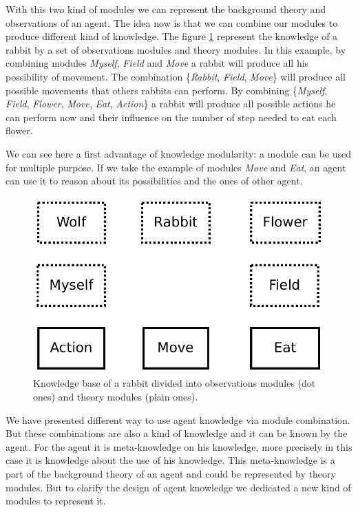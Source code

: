 \documentclass{aamas2012}
\begin{document}
	With this two kind of modules we can represent the background theory and observations of an agent.
	The idea now is that we can combine our modules to produce different kind of knowledge.
	The figure \ref{module_combination} represent the knowledge of a rabbit by a set of observations modules and theory modules.
	In this example, by combining modules \emph{Myself}, \emph{Field} and \emph{Move} a rabbit will produce all his possibility of movement.
	The combination \{\emph{Rabbit}, \emph{Field}, \emph{Move}\} will produce all possible movements that others rabbits can perform. 
	By combining \{\emph{Myself}, \emph{Field}, \emph{Flower}, \emph{Move}, \emph{Eat}, \emph{Action}\} 
	a rabbit will produce all possible actions he can perform now and their influence on the number of step needed to eat each flower.
	
	We can see here a first advantage of knowledge modularity: a module can be used for multiple purpose.
	If we take the example of modules \emph{Move} and \emph{Eat}, an agent can use it to reason about its possibilities and the ones of other agent.
	
	\begin{figure}
		\centering
		\includegraphics[keepaspectratio=true, scale=0.4]{module_combination.pdf}
		\caption
		{
			\label{module_combination}
			Knowledge base of a rabbit divided into observations modules (dot ones) and theory modules (plain ones).
		}
	\end{figure}

	We have presented different way to use agent knowledge via module combination.
	But these combinations are also a kind of knowledge and it can be known by the agent.
	For the agent it is meta-knowledge on his knowledge, more precisely in this case it is knowledge about the use of his knowledge.
	This meta-knowledge is a part of the background theory of an agent and could be represented by theory modules.
	But to clarify the design of agent knowledge we dedicated a new kind of modules to represent it.
\end{document}
